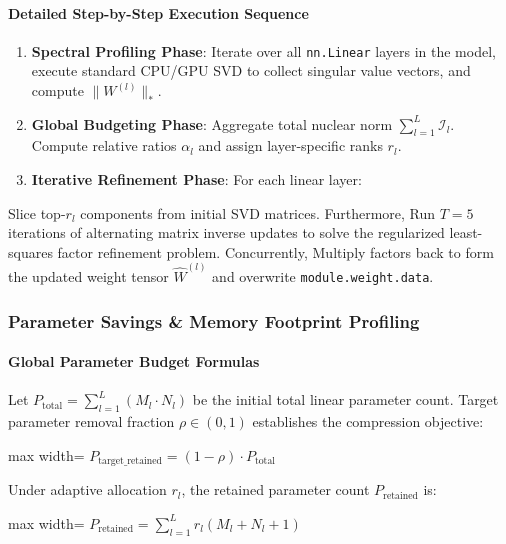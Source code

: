 \paragraph{Detailed Step-by-Step Execution Sequence}
\begin{enumerate}
\item \textbf{Spectral Profiling Phase}: Iterate over all \texttt{nn.Linear} layers in the model, execute standard CPU/GPU SVD to collect singular value vectors, and compute $\|W^{(l)}\|_*$.
\item \textbf{Global Budgeting Phase}: Aggregate total nuclear norm $\sum_{l=1}^L \mathcal{I}_l$. Compute relative ratios $\alpha_l$ and assign layer-specific ranks $r_l$.
\item \textbf{Iterative Refinement Phase}: For each linear layer:
\end{enumerate}
Slice top-$r_l$ components from initial SVD matrices. Furthermore, Run $T = 5$ iterations of alternating matrix inverse updates to solve the regularized least-squares factor refinement problem. Concurrently, Multiply factors back to form the updated weight tensor $\hat{W}^{(l)}$ and overwrite \texttt{module.weight.data}.



\subsubsection*{Parameter Savings \& Memory Footprint Profiling}

\paragraph{Global Parameter Budget Formulas}
Let $P_{\text{total}} = \sum_{l=1}^L (M_l \cdot N_l)$ be the initial total linear parameter count.
Target parameter removal fraction $\rho \in (0, 1)$ establishes the compression objective:

\begin{center}
\begin{adjustbox}{max width=\columnwidth}
$\displaystyle
P_{\text{target\_retained}} = (1 - \rho) \cdot P_{\text{total}}
$
\end{adjustbox}
\end{center}

Under adaptive allocation $r_l$, the retained parameter count $P_{\text{retained}}$ is:

\begin{center}
\begin{adjustbox}{max width=\columnwidth}
$\displaystyle
P_{\text{retained}} = \sum_{l=1}^{L} r_l (M_l + N_l + 1)
$
\end{adjustbox}
\end{center}

